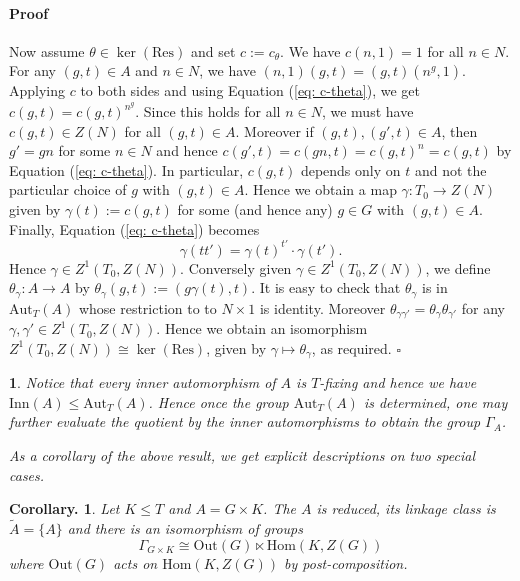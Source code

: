 \documentclass[12pt]{article}
\theoremstyle{change}
\newtheorem{coro}[theorem]{Corollary.}
\newtheorem{nothing}[theorem]{}
\newenvironment{proof}{\paragraph{Proof}}{\hfill$\square$}
\renewcommand{\le}{\leqslant} %
\newcommand{\Aut}{\mathrm{Aut}}
\newcommand{\Hom}{\mathrm{Hom}}
\newcommand{\Inn}{\mathrm{Inn}}
\newcommand{\Out}{\mathrm{Out}}
\newcommand{\Res}{\mathrm{Res}}
\newcommand{\1}{{\bf 1}}
\begin{document}
\begin{proof}
     Now assume $\theta\in\ker(\Res)$ and set $c:= c_\theta$. We have $c(n,1)= 1$ for all $n\in N$. For any $(g,t)\in A$ and $n\in N$, we have $(n,1)(g,t) = (g,t)(n^g, 1)$. Applying $c$ to both sides and using Equation (\ref{eq: c-theta}), we get $c(g,t) = c(g,t)^{n^g}$. Since this holds for all $n\in N$, we must have $c(g,t)\in Z(N)$ for all $(g, t)\in A$. Moreover if $(g,t), (g',t)\in A$, then $g' = gn$ for some $n\in N$ and hence $c(g',t) = c(gn, t) = c(g,t)^{n} = c(g,t)$ by Equation (\ref{eq: c-theta}). In particular, $c(g,t)$ depends only on $t$ and not the particular choice of $g$ with $(g,t)\in A$. Hence we obtain a map $\gamma: T_0\to Z(N)$ given by $\gamma(t) := c(g,t)$ for some (and hence any) $g\in G$ with $(g,t)\in A$. Finally, Equation (\ref{eq: c-theta}) becomes 
    \[
    \gamma(tt') = \gamma(t)^{t'}\cdot \gamma(t').
    \]
    Hence $\gamma\in Z^1(T_0, Z(N))$. Conversely given $\gamma\in Z^1(T_0, Z(N))$, we define $\theta_\gamma:A\to A$ by $\theta_\gamma(g,t) := (g\gamma(t), t)$. It is easy to check that $\theta_\gamma$ is in $\Aut_T(A)$ whose restriction to to $N\times 1$ is identity. Moreover $\theta_{\gamma\gamma'} = \theta_\gamma\theta_{\gamma'}$ for any $\gamma, \gamma'\in Z^1(T_0, Z(N))$. Hence we obtain an isomorphism $Z^1(T_0, Z(N)) \cong\ker(\Res)$, given by $\gamma\mapsto \theta_\gamma$, as required.
\end{proof}
\begin{nothing}
    Notice that every inner automorphism of $A$ is $T$-fixing and hence we have $\Inn(A)\le\Aut_T(A)$. Hence once the group $\Aut_T(A)$ is determined, one may further evaluate the quotient by the inner automorphisms to obtain the group $\Gamma_A$. 

    As a corollary of the above result, we get explicit descriptions on two special cases.
\end{nothing}
\begin{coro}
    Let $K\le T$ and $A = G\times K$. The $A$ is reduced, its linkage class is $\widetilde A = \{A\}$ and there is an isomorphism of groups
    \[
    \Gamma_{G\times K} \cong \Out(G)\ltimes \Hom(K, Z(G))
    \]
    where $\Out(G)$ acts on $\Hom(K, Z(G))$ by post-composition.
\end{coro}
\end{document}
